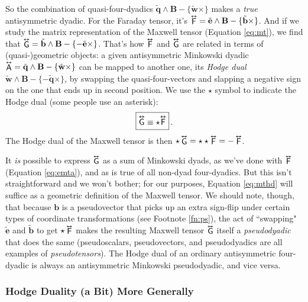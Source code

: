 \documentclass[12pt]{article}
\renewcommand{\vv}[1]{\mathbf{#1}}
\newcommand{\tightoverset}[2]{%
  \mathop{#2}\limits^{\vbox to -.5ex{\kern-0.75ex\hbox{$#1$}\vss}}}
\newcommand{\inlinedy}[1]{\tightoverset{\text{\tiny$\bm\leftrightarrow$}}{#1}}
\newcommand{\capdy}[1]{ \overset{ \text{\tiny$\bm\leftrightarrow$} }{\vphantom{\text{\small{A}}}\smash{#1}} }
\begin{document}
So the combination of quasi-four-dyadics $\tilde{\vv q} \wedge \vv B - \{ \tilde{\vv w} \times \}$ makes a \emph{true} antisymmetric dyadic. For the Faraday tensor, it's $\inlinedy{\mathsf{F}} = \tilde{\vv e} \wedge \vv B - \{ \tilde{\vv b} \times \}$. And if we study the matrix representation of the Maxwell tensor (Equation \ref{eq:mt}), we find that $\inlinedy{\mathsf{G}} = \tilde{\vv b} \wedge \vv B - \{ - \tilde{\vv e} \times \}$. That's how $\inlinedy{\mathsf{F}}$ and $\inlinedy{\mathsf{G}}$ are related in terms of (quasi-)geometric objects: a given antisymmetric Minkowski dyadic ${\inlinedy{\mathsf{A}} = \tilde{\vv q} \wedge \vv B - \{ \tilde{\vv w} \times \}}$ can be mapped to another one, its \emph{Hodge dual} ${\tilde{\vv w} \wedge \vv B - \{ - \tilde{\vv q} \times \}}$, by swapping the quasi-four-vectors and slapping a negative sign on the one that ends up in second position. We use the $\star$ symbol to indicate the Hodge dual (some people use an asterisk):
\begin{equation}\label{eq:mthd}
\boxed{ \vphantom{A_{A_A}} \capdy{\mathsf{G}} \equiv \star \capdy{\mathsf{F}} } \, .
\end{equation}
The Hodge dual of the Maxwell tensor is then $\star \inlinedy{\mathsf{G}} = \star \star \inlinedy{\mathsf{F}} = - \inlinedy{\mathsf{F}}$.

It \emph{is} possible to express $\inlinedy{\mathsf{G}}$ as a sum of Minkowski dyads, as we've done with $\inlinedy{\mathsf{F}}$ (Equation \ref{eq:emta}), and as is true of all non-dyad four-dyadics. But this isn't straightforward and we won't bother; for our purposes, Equation \ref{eq:mthd} will suffice as a geometric definition of the Maxwell tensor. We should note, though, that because $\vv b$ is a pseudovector that picks up an extra sign-flip under certain types of coordinate transformations (see Footnote \ref{fn:ps}), the act of ``swapping" $\tilde{\vv e}$ and $\tilde{\vv b}$ to get $\star \inlinedy{\mathsf{F}}$ makes the resulting Maxwell tensor $\inlinedy{\mathsf{G}}$ itself a \emph{pseudodyadic} that does the same (pseudoscalars, pseudovectors, and pseudodyadics are all examples of \emph{pseudotensors}). The Hodge dual of an ordinary antisymmetric four-dyadic is always an antisymmetric Minkowski pseudodyadic, and vice versa.

\subsubsection{Hodge Duality (a Bit) More Generally}
\end{document}
